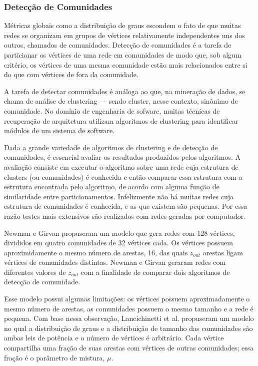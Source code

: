\documentclass{article}
\begin{document}

\subsubsection{Detecção de Comunidades}

Métricas globais como a distribuição de graus escondem o fato de que muitas redes se organizam em grupos de vértices relativamente independentes uns dos outros, chamados de comunidades. Detecção de comunidades é a tarefa de particionar os vértices de uma rede em comunidades de modo que, sob algum critério, os vértices de uma mesma comunidade estão mais relacionados entre si do que com vértices de fora da comunidade.

A tarefa de detectar comunidades é análoga ao que, na mineração de dados, se chama de análise de clustering --- sendo cluster, nesse contexto, sinônimo de comunidade. No domínio de engenharia de sofware, muitas técnicas de recuperação de arquitetura utilizam algoritmos de clustering para identificar módulos de um sistema de software.

Dada a grande variedade de algoritmos de clustering e de detecção de comunidades, é essencial avaliar os resultados produzidos pelos algoritmos. A avaliação consiste em executar o algoritmo sobre uma rede cuja estrutura de clusters (ou comunidades) é conhecida e então comparar essa estrutura com a estrutura encontrada pelo algoritmo, de acordo com alguma função de similaridade entre particionamentos. Infelizmente não há muitas redes cuja estrutura de comunidades é conhecida, e as que existem são pequenas. Por essa razão testes mais extensivos são realizados com redes geradas por computador.

Newman e Girvan \cite{Newman2004a} propuseram um modelo que gera redes com 128 vértices, divididos em quatro comunidades de 32 vértices cada. Os vértices possuem aproximidamente o mesmo número de arestas, 16, das quais $z_{out}$ arestas ligam vértices de comunidades distintas. Newman e Girvan geraram redes com diferentes valores de $z_{out}$ com a finalidade de comparar dois algoritmos de detecção de comunidade.

Esse modelo possui algumas limitações: os vértices possuem aproximadamente o mesmo número de arestas, as comunidades possuem o mesmo tamanho e a rede é pequena. Com base nessa observação, Lancichinetti et al. \cite{Lancichinetti2008} propuseram um modelo no qual a distribuição de graus e a distribuição de tamanho das comunidades são ambas leis de potência e o número de vértices é arbitrário. Cada vértice compartilha uma fração de suas arestas com vértices de outras comunidades; essa fração é o parâmetro de mistura, $\mu$.
\end{document}
